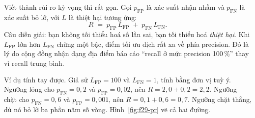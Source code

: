 \documentclass[../../deep_learning.tex]{subfiles}
\begin{document}
Viết thành rủi ro kỳ vọng thì rất gọn. Gọi \(p_{\text{FP}}\) là xác suất nhận nhầm và \(p_{\text{FN}}\) là xác suất bỏ lỡ, với \(L\) là thiệt hại tương ứng:
\[
R \;=\; p_{\text{FP}}\,L_{\text{FP}} \;+\; p_{\text{FN}}\,L_{\text{FN}}.
\]
Câu diễn giải: bạn không tối thiểu hoá số lần sai, bạn tối thiểu hoá \emph{thiệt hại}. Khi \(L_{\text{FP}}\) lớn hơn \(L_{\text{FN}}\) chừng một bậc, điểm tối ưu dịch rất xa về phía precision. Đó là lý do cộng đồng nhận dạng địa điểm báo cáo ``recall ở mức precision 100\,\%'' thay vì recall trung bình.

Ví dụ tính tay được. Giả sử \(L_{\text{FP}}=100\) và \(L_{\text{FN}}=1\), tính bằng đơn vị tuỳ ý. Ngưỡng lỏng cho \(p_{\text{FN}}=0{,}2\) và \(p_{\text{FP}}=0{,}02\), nên \(R = 2{,}0+0{,}2 = 2{,}2\). Ngưỡng chặt cho \(p_{\text{FN}}=0{,}6\) và \(p_{\text{FP}}=0{,}001\), nên \(R = 0{,}1+0{,}6=0{,}7\). Ngưỡng chặt thắng, dù nó bỏ lỡ ba phần năm số vòng. Hình~\ref{fig:f29-pr} vẽ cả hai đường.
\end{document}

